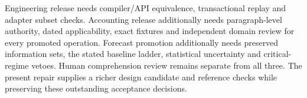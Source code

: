 Engineering release needs compiler/API equivalence, transactional replay and
adapter subset checks. Accounting release additionally needs paragraph-level
authority, dated applicability, exact fixtures and independent domain review
for every promoted operation. Forecast promotion additionally needs preserved
information sets, the stated baseline ladder, statistical uncertainty and
critical-regime vetoes. Human comprehension review remains separate from all
three. The present repair supplies a richer design candidate and reference
checks while preserving these outstanding acceptance decisions.
